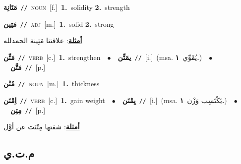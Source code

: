 \documentclass[10pt,a4paper,twoside]{article} %
\begin{document}
\begin{multicols}{2}
{{{{{{{{{\setlength\topsep{0pt}\textbf{\foreignlanguage{arabic}{مَتَانِة}}\ {\color{gray}\texttt{//}\color{black}}\ \textsc{noun}\ [f.]\ \textbf{1.}~solidity  \textbf{2.}~strength\ 

{\setlength\topsep{0pt}\textbf{\foreignlanguage{arabic}{مَتِين}}\ {\color{gray}\texttt{//}\color{black}}\ \textsc{adj}\ [m.]\ \textbf{1.}~solid  \textbf{2.}~strong\  \begin{flushright}\color{gray}\foreignlanguage{arabic}{\textbf{\underline{\foreignlanguage{arabic}{أمثلة}}}: علاقتنا مَتِينة الحمدلله}\end{flushright}\color{black}} \vspace{2mm}

{\setlength\topsep{0pt}\textbf{\foreignlanguage{arabic}{مَتِّن}}\ {\color{gray}\texttt{//}\color{black}}\ \textsc{verb}\ [c.]\ \textbf{1.}~strengthen\ \ $\bullet$\ \ \setlength\topsep{0pt}\textbf{\foreignlanguage{arabic}{يمَتِّن}}\ {\color{gray}\texttt{//}\color{black}}\ [i.]\ \color{gray}(msa. \foreignlanguage{arabic}{يُقَوِّي}~\foreignlanguage{arabic}{\textbf{١.}})\color{black}\ \ $\bullet$\ \ \setlength\topsep{0pt}\textbf{\foreignlanguage{arabic}{مَتَّن}}\ {\color{gray}\texttt{//}\color{black}}\ [p.]\ 

{\setlength\topsep{0pt}\textbf{\foreignlanguage{arabic}{مُتْن}}\ {\color{gray}\texttt{//}\color{black}}\ \textsc{noun}\ [m.]\ \textbf{1.}~thickness\ 

{\setlength\topsep{0pt}\textbf{\foreignlanguage{arabic}{اِمْتَن}}\ {\color{gray}\texttt{//}\color{black}}\ \textsc{verb}\ [c.]\ \textbf{1.}~gain weight\ \ $\bullet$\ \ \setlength\topsep{0pt}\textbf{\foreignlanguage{arabic}{يِمْتَن}}\ {\color{gray}\texttt{//}\color{black}}\ [i.]\ \color{gray}(msa. \foreignlanguage{arabic}{يَكْتَسِب وَزْن}~\foreignlanguage{arabic}{\textbf{١.}})\color{black}\ \ $\bullet$\ \ \setlength\topsep{0pt}\textbf{\foreignlanguage{arabic}{مِتِن}}\ {\color{gray}\texttt{//}\color{black}}\ [p.]\  \begin{flushright}\color{gray}\foreignlanguage{arabic}{\textbf{\underline{\foreignlanguage{arabic}{أمثلة}}}: شفتها مِتْنَت عن أوَّل}\end{flushright}\color{black}} \vspace{2mm}

\vspace{-3mm}
\subsection*{\color{blue}\foreignlanguage{arabic}{م.ت.ي}\color{blue}{}} 

}}}}}}}}}}}
\end{multicols}
\end{document}
